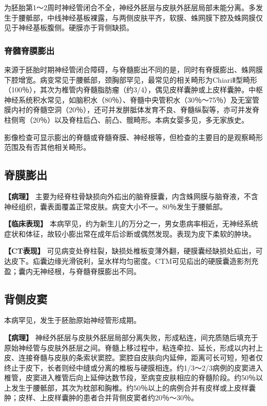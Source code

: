 为胚胎第1～2周时神经管闭合不全，神经外胚层与皮肤外胚层局部未能分离。多发生于腰骶部，中线神经基板裸露，与两侧皮肤平齐，软膜、蛛网膜下腔及蛛网膜仅见于神经基板腹侧。硬膜亦于背侧缺损。

\subsubsection{脊髓脊膜膨出}

来源于胚胎时期神经管闭合障碍，与脊髓膨出不同的是，同时有脊膜膨出、蛛网膜下腔增宽。病变常见于腰骶部，颈胸部罕见，最常见的相关畸形为ChiariⅡ型畸形（100％），其次为椎管内脊髓脂肪瘤（约3/4），偶见皮样囊肿或上皮样囊肿。中枢神经系统积水常见，如脑积水（80％）、脊髓中央管积水（30％～75％）及无室管膜内衬的脊髓空洞（20％），还可并发胼胝体发育不良、脊髓纵裂等，亦可并发脊柱侧弯（20％）以及脊柱后凸、前凸、髋畸形。本病女婴多见，多无家族史。

影像检查可显示膨出的脊髓或脊髓脊膜、神经根等，但检查的主要目的是观察畸形范围及有否其他相关畸形。

\subsection{脊膜膨出}

\textbf{【病理】}
主要为经脊柱骨缺损向外疝出的脑脊膜囊，内含蛛网膜与脑脊液，不含神经组织，囊表面覆盖正常皮肤。病变大小不一。80％发生于腰骶部。

\textbf{【临床表现】}
本病罕见，约为新生儿的万分之一，男女患病率相近，无神经系统症状和体征，故较小膨出常在成年后诊断或偶然发现。表现为皮下柔软的肿块。

\textbf{【CT表现】}
可见病变处脊柱裂，缺损处椎板变薄外翻，硬膜囊经缺损处疝出，可达皮下。疝囊边缘光滑锐利，呈水样均匀密度。CTM可见疝出的硬膜囊造影剂充盈；囊内无神经根，与脊髓脊膜膨出不同。

\subsection{背侧皮窦}

本病罕见，发生于胚胎原始神经管形成期。

\textbf{【病理】}
神经外胚层与皮肤外胚层局部分离失败，形成粘连，间充质随后填充于原始神经管与皮肤外胚层之间。脊髓上移过程中，粘连牵拉、延长，形成以内衬上皮、连接脊髓与皮肤的条索状窦腔。窦腔自皮肤向内延伸，距离可长可短，短者仅终止于皮下，长者则经中缝或分离的椎板与硬膜相连。约1/3～2/3病例的皮窦进入椎管，皮窦进入椎管后向上延伸达数节段，至病变皮肤相应的脊髓阶段。约50％以上发生于腰骶部，其次为枕部和胸椎。约50％以上的病例合并有皮样或上皮样囊肿；皮样、上皮样囊肿的患者合并背侧皮窦者约20％～30％。

